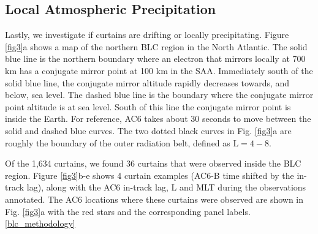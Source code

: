 \documentclass[draft]{agujournal2019}
\begin{document}
\subsection{Local Atmospheric Precipitation}
Lastly, we investigate if curtains are drifting or locally precipitating. Figure \ref{fig3}a shows a map of the northern BLC region in the North Atlantic. The solid blue line is the northern boundary where an electron that mirrors locally at 700 km has a conjugate mirror point at 100 km in the SAA. Immediately south of the solid blue line, the conjugate mirror altitude rapidly decreases towards, and below, sea level. The dashed blue line is the boundary where the conjugate mirror point altitude is at sea level. South of this line the conjugate mirror point is inside the Earth. For reference, AC6 takes about 30 seconds to move between the solid and dashed blue curves. The two dotted black curves in Fig. \ref{fig3}a are roughly the boundary of the outer radiation belt, defined as $\mathrm{L}=4-8$.

Of the 1,634 curtains, we found 36 curtains that were observed inside the BLC region. Figure \ref{fig3}b-e shows 4 curtain examples (AC6-B time shifted by the in-track lag), along with the AC6 in-track lag, L and MLT during the observations annotated. The AC6 locations where these curtains were observed are shown in Fig. \ref{fig3}a with the red stars and the corresponding panel labels.  \ref{blc_methodology} 
\end{document}
